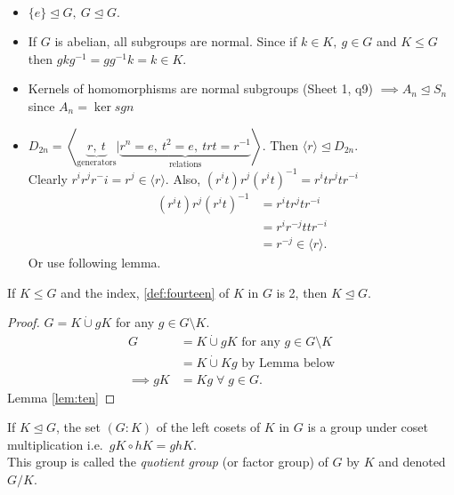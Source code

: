 \begin{example}

~

\begin{itemize}
\item
  \(\{ e \} \trianglelefteq G,\ G \trianglelefteq G\).
\item
  If \(G\) is abelian, all subgroups are normal.
  Since if \(k \in K,\ g \in G\) and \(K \leq G\) then \(gkg^{-1} = gg^{-1} k = k \in K\).
\item
  Kernels of homomorphisms are normal subgroups (Sheet 1, q9) \(\implies A_n \trianglelefteq S_n\) since \(A_n = \ker sgn\)
\item
  \(D_{2n} = \left\langle \underbrace{r,\ t}_\text{generators} | \underbrace{r^n = e,\ t^2 = e,\ trt = r^{-1}}_\text{relations} \right\rangle\).
  Then \(\langle r \rangle \trianglelefteq D_{2n}\).\\
  Clearly \(r^i r^j r^-i = r^j \in \langle r \rangle\).
  Also, \((r^i t) r^j (r^i t)^{-1} = r^i t r^j t r^{-i}\)
  \begin{align*}
    (r^i t) r^j (r^i t)^{-1} &= r^i t r^j t r^{-i} \\
    &= r^i r^{-j} t t r^{-i} \\
    &= r^{-j} \in \langle r \rangle.
  \end{align*}
  Or use following lemma.
\end{itemize}

\end{example}

\begin{lemma}
\protect\hypertarget{lem:twelve}{}\label{lem:twelve}If \(K \leq G\) and the index, \ref{def:fourteen} of \(K\) in \(G\) is 2, then \(K \trianglelefteq G\).
\end{lemma}

\begin{proof}
\(G = K \dot{\cup} gK\) for any \(g \in G \setminus K\).
\begin{align*}
    G &= K \dot{\cup} gK \text{ for any } g \in G \setminus K \\
    &= K \dot{\cup} Kg \text{ by Lemma below} \\
    \implies gK &= Kg \; \forall \; g \in G.
\end{align*} Lemma \ref{lem:ten}
\end{proof}

\begin{theorem}
\protect\hypertarget{thm:five}{}\label{thm:five}If \(K \trianglelefteq G\), the set \((G : K)\) of the left cosets of \(K\) in \(G\) is a group under coset multiplication i.e.~\(gK \circ hK = ghK\).\\
This group is called the \emph{quotient group} (or factor group) of \(G\) by \(K\) and denoted \(G / K\).
\end{theorem}

